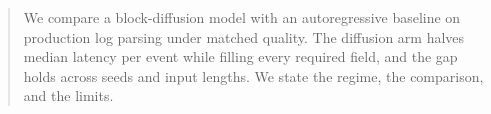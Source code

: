 \documentclass{article}
\begin{document}
\begin{abstract}
We compare a block-diffusion model with an autoregressive baseline on
production log parsing under matched quality. The diffusion arm halves
median latency per event while filling every required field, and the gap
holds across seeds and input lengths. We state the regime, the comparison,
and the limits.
\end{abstract}


\end{document}
